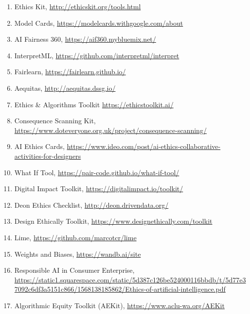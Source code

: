 \documentclass[acmsmall]{acmart}
\begin{document}
\begin{enumerate}[label=T\arabic*]
    \item \label{itm:T1-EthicsKit}Ethics Kit, \url{http://ethicskit.org/tools.html}
    \item \label{itm:T2-ModelCards}Model Cards, \url{https://modelcards.withgoogle.com/about}
    \item \label{itm:T3-AIF360} AI Fairness 360, \url{https://aif360.mybluemix.net/}
    \item \label{itm:T4-InterpretML} InterpretML, \url{https://github.com/interpretml/interpret}
    \item \label{itm:T5-Fairlearn} Fairlearn,	\url{https://fairlearn.github.io/}
    \item \label{itm:T6-Aequitas} Aequitas,	\url{http://aequitas.dssg.io/}
    \item \label{itm:T7-EthicsAndAlgorithms}\label{itm:T15-EthicsAndAlgorithms} Ethics \& Algorithms Toolkit \url{https://ethicstoolkit.ai/}
    \item \label{itm:T8-ConsequenceScanning} Consequence Scanning Kit,	\url{https://www.doteveryone.org.uk/project/consequence-scanning/}
    \item \label{itm:T9-AIEthicsCards} AI Ethics Cards, \url{https://www.ideo.com/post/ai-ethics-collaborative-activities-for-designers}
    \item \label{itm:T10-WhatIf} What If Tool, \url{https://pair-code.github.io/what-if-tool/}
    \item \label{itm:T11-DigitalImpactToolkit} Digital Impact Toolkit, \url{https://digitalimpact.io/toolkit/}
    \item \label{itm:T12-Deon}	Deon Ethics Checklist, \url{http://deon.drivendata.org/}
    \item \label{itm:T13-DesignEthically} Design Ethically Toolkit, \url{https://www.designethically.com/toolkit}
    \item \label{itm:T14-Lime} Lime, \url{https://github.com/marcotcr/lime}
    \item \label{itm:T26-WeightsBalances} Weights and Biases, \url{https://wandb.ai/site}
    \item \label{itm:T16-ResponsibleAI}	Responsible AI in Consumer Enterprise,	\url{https://static1.squarespace.com/static/5d387c126be524000116bbdb/t/5d77e37092c6df3a5151c866/1568138185862/Ethics-of-artificial-intelligence.pdf}
    \item \label{itm:T17-AEKit}	Algorithmic Equity Toolkit (AEKit),	\url{https://www.aclu-wa.org/AEKit}

\end{enumerate}
\end{document}
